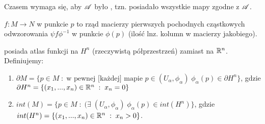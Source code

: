 \begin{description}[leftmargin=15mm, font=\color{green}]
    Czasem wymaga się, aby $\mathcal{A}$ było , tzn. posiadało wszystkie mapy zgodne z $\mathcal{A}$.
  \item[Rząd funkcji] $f:M\to N$ w punkcie $p$ to rząd macierzy pierwszych pochodnych cząstkowych odwzorowania $\psi f\phi^{-1}$ w punkcie $\phi(p)$ (ilość lnz. kolumn w macierzy jakobiego).
  \item[Rozmaitość z brzegiem] posiada atlas funkcji na $H^n$ (rzeczywistą półprzestrzeń) zamiast na $\mathbb{R}^n$. Definiujemy: $ $\newline
    \begin{enumerate}
      \item $\partial M=\{p\in M\;:\;\text{w pewnej [każdej] mapie }p\in(U_\alpha,\phi_\alpha)\;\phi_\alpha(p)\in\partial H^n\}$, gdzie $\partial H^n=\{(x_1,...,x_n)\in\mathbb{R}^n\;:\;x_n=0\}$
      \item $int(M)=\{p\in M\;:\;(\exists\;(U_\alpha,\phi_\alpha)\;\phi_\alpha(p)\in int(H^n)\}$, gdzie $int(H^n)=\{(x_1,...,x_n)\in\mathbb{R}^n\;:\;x_n>0\}$.
    \end{enumerate}

  \item[STRONA 19]
\end{description}
